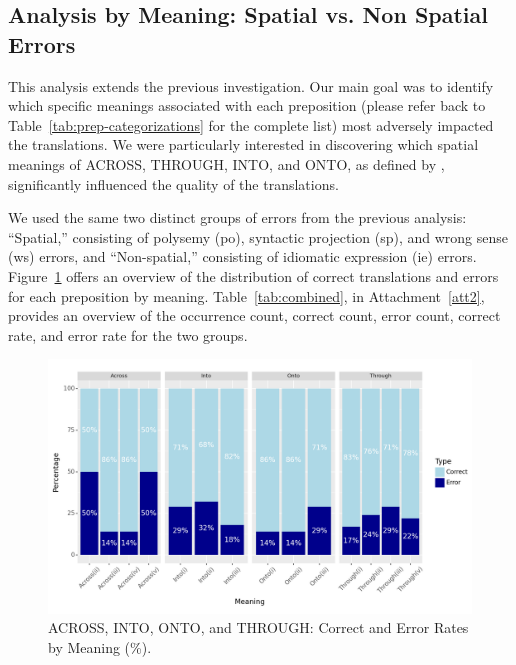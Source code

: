 
\subsection{Analysis by Meaning: Spatial vs. Non Spatial Errors}
\label{subsec: sp-vs-nsp}

This analysis extends the previous investigation. Our main goal was to identify which specific meanings associated with each preposition (please refer back to Table~\ref{tab:prep-categorizations} for the complete list) most adversely impacted the translations. We were particularly interested in discovering which spatial meanings of ACROSS, THROUGH, INTO, and ONTO, as defined by \textcite{bruckfield2011prepositions}, significantly influenced the quality of the translations.

We used the same two distinct groups of errors from the previous analysis: ``Spatial,'' consisting of polysemy (po), syntactic projection (sp), and wrong sense (ws) errors, and ``Non-spatial,'' consisting of idiomatic expression (ie) errors. Figure~\ref{fig: all-perc} offers an overview of the distribution of correct translations and errors for each preposition by meaning. Table~\ref{tab:combined}, in Attachment~\ref{att2}, provides an overview of the occurrence count, correct count, error count, correct rate, and error rate for the two groups.

\begin{figure}[htb]
        \centering
        \includegraphics[width=1\textwidth]{textual/Figuras/Results/Unknown-71.png}
        \caption{ACROSS, INTO, ONTO, and THROUGH: Correct and Error Rates by Meaning (\%).}
        \label{fig: all-perc}
\end{figure}

